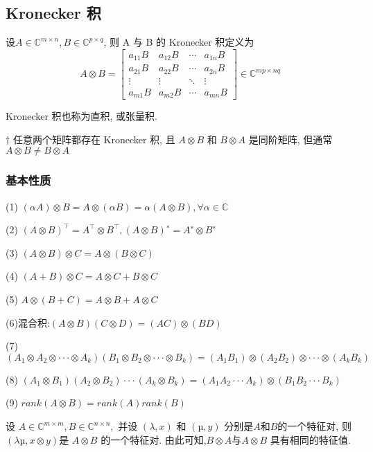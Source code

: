 \documentclass[12pt,a4paper]{article}
\begin{document}
\subsection{Kronecker 积}
\begin{framed}
	\begin{definition}
		设$A \in \mathbb{C}^{m \times n}, B \in \mathbb{C}^{p \times q}$, 则 A 与 B 的 Kronecker 积定义为
			$$
			A \otimes B=\left[\begin{array}{cccc}{a_{11} B} & {a_{12} B} & {\cdots} & {a_{1 n} B} \\ {a_{21} B} & {a_{22} B} & {\cdots} & {a_{2 n} B} \\ {\vdots} & {\vdots} & {\ddots} & {\vdots} \\ {a_{m 1} B} & {a_{m 2} B} & {\cdots} & {a_{m n} B}\end{array}\right] \in \mathbb{C}^{m p \times n q}
			$$
			
			Kronecker 积也称为直积, 或张量积.
	\end{definition}
\end{framed}

\begin{framed}
	† 任意两个矩阵都存在 Kronecker 积, 且 $A ⊗ B$ 和 $B ⊗ A$ 是同阶矩阵,
	但通常 $A \otimes B \neq B \otimes A$
\end{framed}


\subsubsection{基本性质}
\begin{framed}
	(1) $(αA) ⊗ B = A ⊗ (αB) = α(A ⊗ B), ∀ α ∈ \mathbb{C}$
	
	(2) $(A ⊗ B)^{⊺} = A^{⊺} ⊗ B^{⊺}, (A ⊗ B)^{∗} = A^{∗} ⊗ B^{∗}$
	
	(3) $(A ⊗ B) ⊗ C = A ⊗ (B ⊗ C)$
	
	(4) $(A + B) ⊗ C = A ⊗ C + B ⊗ C$
	
	(5) $A ⊗ (B + C) = A ⊗ B + A ⊗ C$
	
	(6)混合积:$ (A ⊗ B)(C ⊗ D) = (AC) ⊗ (BD)$
	
	(7) $(A_1 ⊗ A_2 ⊗ · · · ⊗ A_k)(B_1 ⊗ B_2 ⊗ · · · ⊗ B_k)
	= (A_1B_1) ⊗ (A_2B_2) ⊗ · · · ⊗ (A_kB_k)$
	
	(8) $(A_1 ⊗ B_1)(A_2 ⊗ B_2)· · ·(A_k ⊗ B_k)
	= (A_1A_2 · · · A_k) ⊗ (B_1B_2 · · · B_k)$
	
	(9) $rank(A ⊗ B) = rank(A)rank(B)$
	
\end{framed}

\begin{framed}
	\begin{theorem}
		设 $A ∈ \mathbb{C}^{m×m}, B ∈ \mathbb{C}^{n×n},$ 并设 $(λ, x)$ 和 $(µ, y)$ 分别是$ A $和$ B $的一个特征对, 则 $(λµ, x ⊗ y) $是 $A ⊗ B$ 的一个特征对. 由此可知,$ B ⊗ A $与$A ⊗ B$ 具有相同的特征值.	
	\end{theorem}
\end{framed}
\end{document}
